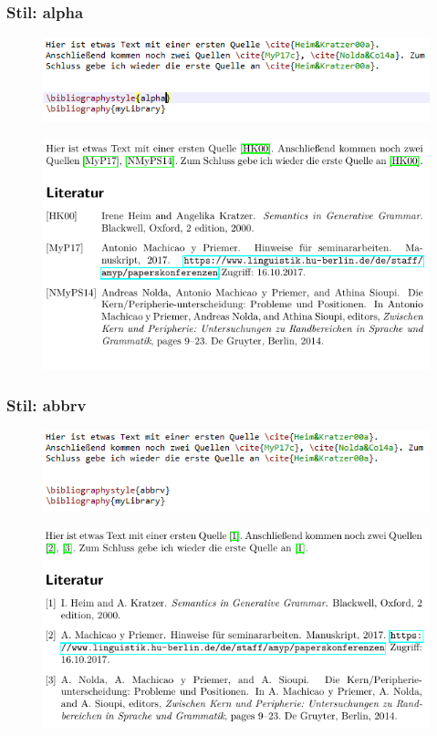 \begin{frame}[fragile]
\frametitle{Stil: alpha}

\begin{figure}
	\centering
	\includegraphics[width=.70\textwidth]{../../texfiles-beamer/tex-material/WissArb-latex/bib_alpha_tex}
\end{figure}

\begin{figure}
	\centering
	\includegraphics[width=.70\textwidth]{../../texfiles-beamer/tex-material/WissArb-latex/bib_alpha_pdf}
\end{figure}

\end{frame}


\begin{frame}[fragile]
\frametitle{Stil: abbrv}

\begin{figure}
	\centering
	\includegraphics[width=.70\textwidth]{../../texfiles-beamer/tex-material/WissArb-latex/bib_abbrv_tex}
\end{figure}

\begin{figure}
	\centering
	\includegraphics[width=.70\textwidth]{../../texfiles-beamer/tex-material/WissArb-latex/bib_abbrv_pdf}
\end{figure}

\end{frame}


